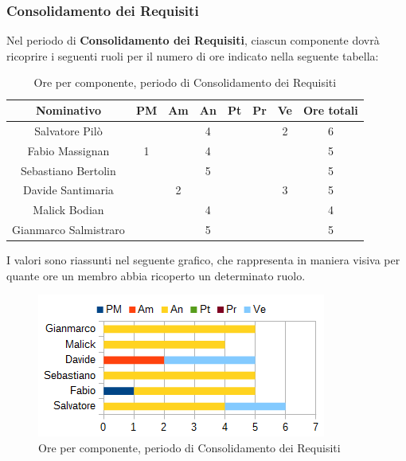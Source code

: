 		\subsubsection{Consolidamento dei Requisiti}
		Nel periodo di \textbf{Consolidamento dei Requisiti}, ciascun componente dovrà ricoprire i seguenti ruoli per il numero di ore indicato nella seguente tabella: \\
		\begin{table}[H]
		\centering
		\begin{tabular}{|c|c|c|c|c|c|c|c|}
			\hline
			\textbf{Nominativo}		& \textbf{PM}	& \textbf{Am}	& \textbf{An}	& \textbf{Pt}	& \textbf{Pr}	& \textbf{Ve}	& \textbf{Ore totali}     \\
			\hline
			Salvatore Pilò			&		& 		& 4		&		&		& 2		& 6 \\
			Fabio Massignan			& 1		& 		& 4		&		&		& 		& 5 \\
			Sebastiano Bertolin		&		& 		& 5		&		&		&		& 5 \\
			Davide Santimaria		&		& 2		&		&		&		& 3		& 5 \\
			Malick Bodian			& 		& 		& 4		&		&		& 		& 4 \\
			Gianmarco Salmistraro	&		& 		& 5		&		&		& 		& 5 \\
			\hline
		\end{tabular}
		\caption{Ore per componente, periodo di Consolidamento dei Requisiti}
		\end{table}
		I valori sono riassunti nel seguente grafico, che rappresenta in maniera visiva per quante ore un membro abbia ricoperto un determinato ruolo. \\
		\begin{figure}[H]
			\centering
			\includegraphics[width=1\linewidth]{immagini/grafici/analisi_dettaglio-barra.png}
			\caption{Ore per componente, periodo di Consolidamento dei Requisiti}
		\end{figure}
